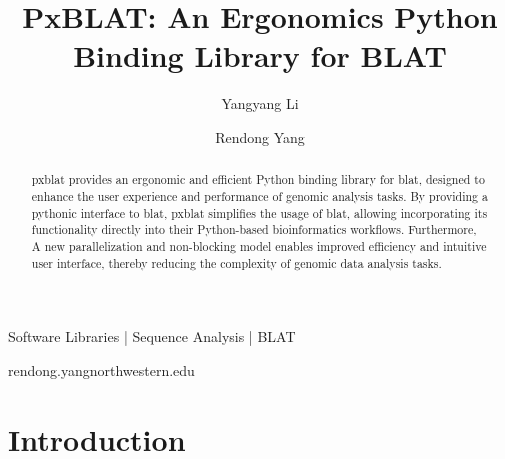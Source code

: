 
\title{PxBLAT: An Ergonomics Python Binding Library for BLAT}

\author[1]{Yangyang Li}
\author[1,\Letter]{Rendong Yang }
\date{}

\maketitle


\begin{abstract}
	\gls{pxblat} provides an ergonomic and efficient Python binding library for \gls{blat}, designed to enhance the user experience and performance of genomic analysis tasks.
	By providing a pythonic interface to \gls{blat}, \gls{pxblat} simplifies the usage of \gls{blat}, allowing incorporating its functionality directly into their Python-based bioinformatics workflows.
	Furthermore, A new parallelization and non-blocking model enables improved efficiency and intuitive user interface, thereby reducing the complexity of genomic data analysis tasks.
\end{abstract}


\begin{keywords}
	Software Libraries |  Sequence Analysis | BLAT
\end{keywords}

\begin{corrauthor}
	rendong.yang\at northwestern.edu
\end{corrauthor}

\section*{Introduction}\label{sec:introduction}

